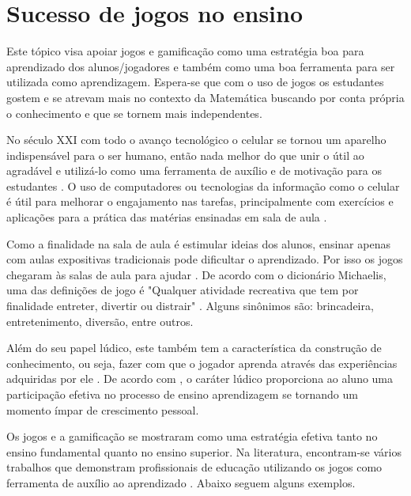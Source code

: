 
\section[Sucesso de jogos no ensino]{Sucesso de jogos no ensino}



Este tópico visa apoiar jogos e gamificação como uma estratégia boa para aprendizado dos alunos/jogadores e também como uma boa ferramenta para ser utilizada como aprendizagem. Espera-se que com o uso de jogos os estudantes gostem e se atrevam mais no contexto da Matemática buscando por conta própria o conhecimento e que se tornem mais independentes.

No século XXI com todo o avanço tecnológico o celular se tornou um aparelho indispensável para o ser humano, então nada melhor do que unir o útil ao agradável e utilizá-lo como uma ferramenta de auxílio e de motivação para os estudantes \cite{softwaregamificado}. O uso de computadores ou tecnologias da informação como o celular é útil para melhorar o engajamento nas tarefas, principalmente com exercícios e aplicações para a prática das matérias ensinadas em sala de aula \cite{tdahNasEscolas2}.

Como a finalidade na sala de aula é estimular ideias dos alunos, ensinar apenas com aulas expositivas tradicionais pode dificultar o aprendizado. Por isso os jogos chegaram às salas de aula para ajudar \cite[p. 4]{sucessoJogoEngSoft}. De acordo com o dicionário Michaelis, uma das definições de jogo é "Qualquer atividade recreativa que tem por finalidade entreter, divertir ou distrair" \cite{Michaelis}. Alguns sinônimos são: brincadeira, entretenimento, diversão, entre outros. 

Além do seu papel lúdico, este também tem a característica da construção de conhecimento, ou seja, fazer com que o jogador aprenda através das experiências adquiridas por ele \cite{jogoPratPedagoc} \cite{appcalculo} \cite{Nunes} \cite{fukusawa}. De acordo com \cite{jogoPratPedagoc}, o caráter lúdico proporciona ao aluno uma participação efetiva no processo de ensino aprendizagem se tornando um momento ímpar de crescimento pessoal. 

Os jogos e a gamificação se mostraram como uma estratégia efetiva tanto no ensino fundamental quanto no ensino superior. Na literatura, encontram-se vários trabalhos que demonstram profissionais de educação utilizando os jogos como ferramenta de auxílio ao aprendizado \cite[p. 3]{sucessoJogoEngSoft}. Abaixo seguem alguns exemplos.

